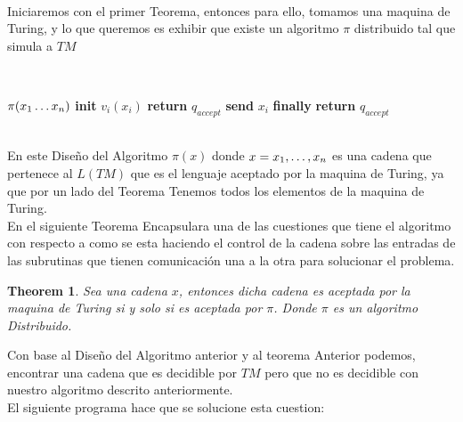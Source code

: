\documentclass[11pt]{article}
\newtheorem{theorem}{Theorem}
\begin{document}
    \\
    Iniciaremos con el primer Teorema, entonces para ello, tomamos una maquina de Turing,
    y lo que queremos es exhibir que existe un algoritmo $\pi$ distribuido tal que simula a $TM$

    \\

    \begin{algorithm}
        \begin{algorithmic}
            \STATE $\pi(x_{1}\mathellipsis x_{n})$
               \STATE \textbf{init} $v_{i}(x_{i})$
                    \STATE \textbf{return} $q_{accept}$
                 \ELSE
                    \STATE \textbf{send} $ x_{i}$
                 \ENDIF
            \ENDFOR
            \STATE \textbf{finally} \textbf{return} $q_{accept}$
        \end{algorithmic}
        \caption{$\pi(x_{i}\mathellipsis x_{n}$)\label{lss}}
    \end{algorithm}

    \\
    En este Diseño del Algoritmo $\pi(x)$ donde $x = x_{1},\mathellipsis, x_{n}$
    es una cadena que pertenece al $L(TM)$ que es el lenguaje aceptado por
    la maquina de Turing, ya que por un lado del Teorema Tenemos todos los elementos
    de la maquina de Turing.
    \\
    En el siguiente Teorema Encapsulara una de las cuestiones que tiene el algoritmo
    con respecto a como se esta haciendo el control de la cadena sobre las entradas de
    las subrutinas que tienen comunicación una a la otra para solucionar el problema.
    \\
    \begin{theorem}
        Sea una cadena $x$, entonces dicha cadena es aceptada por la maquina 
        de Turing si y solo si es aceptada por $\pi$. Donde $\pi$ es un algoritmo
        Distribuido.
    \end{theorem}

    \newpage
    Con base al Diseño del Algoritmo anterior y al teorema Anterior podemos,
    encontrar una cadena que es decidible por $TM$ pero que no es decidible
    con nuestro algoritmo descrito anteriormente.
    \\
    El siguiente programa hace que se solucione esta cuestion:
\end{document}
